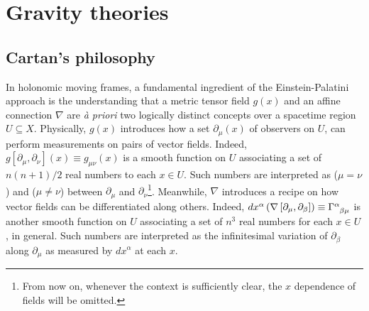 \documentclass[../../main.tex]{subfiles}
\begin{document}
\section{Gravity theories}\label{sec:gravities}

\subsection{Cartan's philosophy}\label{ssec:cartan's_philosophy}

In holonomic moving frames, a fundamental ingredient of the Einstein-Palatini approach is the understanding that a metric tensor field $g(x)$ and an affine connection $\nabla$ are \textit{\`a priori} two logically distinct concepts over a spacetime region $ U \subseteq X $. Physically, $g(x)$ introduces how a set $ \partial_\mu (x) $ of observers on $ U $, can perform  measurements on pairs of vector fields. Indeed, $g\left[\partial_\mu,\partial_\nu\right] \left(x\right)\equiv g_{\mu\nu} \left(x\right)$ is a smooth function on $U$ associating a set of $n\left(n+1\right)/2$ real numbers to each $ x \in U $. Such numbers are interpreted as  ($\mu=\nu$) and  ($\mu\neq \nu$) between $\partial_\mu$ and $\partial_\nu$\footnote{From now on, whenever the context is sufficiently clear, the $x$ dependence of fields will be omitted.}. Meanwhile, $\nabla$ introduces a recipe on how vector fields can be differentiated along others. Indeed, $ dx^\alpha \left( \nabla \left[ \partial_\mu, \partial_\beta \right] \right) \equiv \tensor{\Gamma}{^\alpha_{\beta\mu}} $ is another smooth function on $ U $ associating a set of $n^3$ real numbers for each $ x \in U $, in general. Such numbers are interpreted as the infinitesimal variation of $ \partial_\beta $ along $\partial_\mu$ as measured by $dx^\alpha$ at each $x$.
\end{document}
